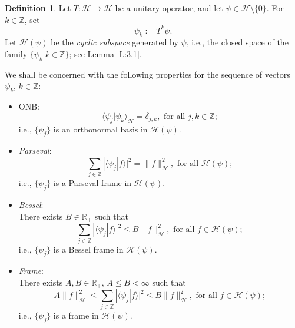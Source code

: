 \documentclass{birkmult}
\theoremstyle{definition}
\newtheorem{defn}[thm]{Definition}
\theoremstyle{remark}
\numberwithin{equation}{section}
\begin{document}
\begin{defn}
\label{D:4.2}
Let $T:\mathcal{H} \to \mathcal{H}$ be a unitary operator, and let 
$\psi \in \mathcal{H}\setminus \{0\}$.  For $k \in \mathbb{Z}$, set 
\begin{equation}
\label{E:psiT}
  \psi_{k} := T^{k}\psi.
\end{equation}
Let $\mathcal{H}(\psi)$ be the \textit{cyclic subspace} generated by $\psi$, 
i.e., the closed space of the family $\{\psi_{k}|k \in \mathbb{Z}\}$; 
see Lemma \ref{L:3.1}.

We shall be concerned with the following properties for the sequence of 
vectors $\psi_{k}$, $k \in \mathbb{Z}$:
\begin{itemize}
  \item ONB:  
    \begin{equation}
    \label{E:4.5} 
      \langle \psi_{j} | \psi_{k} \rangle_{\mathcal{H}} = 
      \delta_{j,k}, \text{ for all } j, k \in \mathbb{Z}; 
    \end{equation}
    i.e., $\{\psi_{j}\}$ is an orthonormal basis in $\mathcal{H}(\psi)$.
  \item \textit{Parseval}:
    \begin{equation}
    \label{E:4.6} 
      \sum_{j \in \mathbb{Z}} |\langle \psi_{j}|f \rangle|^{2} = 
      \|f\|_{\mathcal{H}}^{2}, \text{ for all } \mathcal{H}(\psi);
    \end{equation}
    i.e., $\{\psi_{j}\}$ is a Parseval frame in $\mathcal{H}(\psi)$.
  \item \textit{Bessel}: \\
    There exists $B \in \mathbb{R}_{+}$ such that 
    \begin{equation}
    \label{E:4.7} 
      \sum_{j \in \mathbb{Z}} |\langle \psi_{j}|f \rangle|^{2} \leq
      B\|f\|_{\mathcal{H}}^{2}, \text{ for all } f \in \mathcal{H}(\psi);  
    \end{equation}
    i.e., $\{\psi_{j}\}$ is a Bessel frame in $\mathcal{H}(\psi)$.
  \item \textit{Frame}: \\
    There exists $A, B \in \mathbb{R}_{+}$, $A \leq B < \infty$ such that 
    \begin{equation}
    \label{E:4.8} 
      A\|f\|_{\mathcal{H}}^{2} \leq 
      \sum_{j \in \mathbb{Z}} |\langle \psi_{j}|f \rangle|^{2} \leq
      B\|f\|_{\mathcal{H}}^{2}, \text{ for all } f \in \mathcal{H}(\psi); 
    \end{equation}
    i.e., $\{\psi_{j}\}$ is a frame in $\mathcal{H}(\psi)$.

\end{itemize}
\end{defn}
\end{document}
